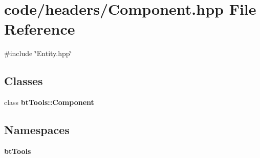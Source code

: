 \section{code/headers/\+Component.hpp File Reference}
\label{_component_8hpp}
{\ttfamily \#include \char`\"{}Entity.\+hpp\char`\"{}}\newline
\subsection*{Classes}
\begin{DoxyCompactItemize}
\item 
class \textbf{ bt\+Tools\+::\+Component}
\end{DoxyCompactItemize}
\subsection*{Namespaces}
\begin{DoxyCompactItemize}
\item 
 \textbf{ bt\+Tools}
\end{DoxyCompactItemize}
